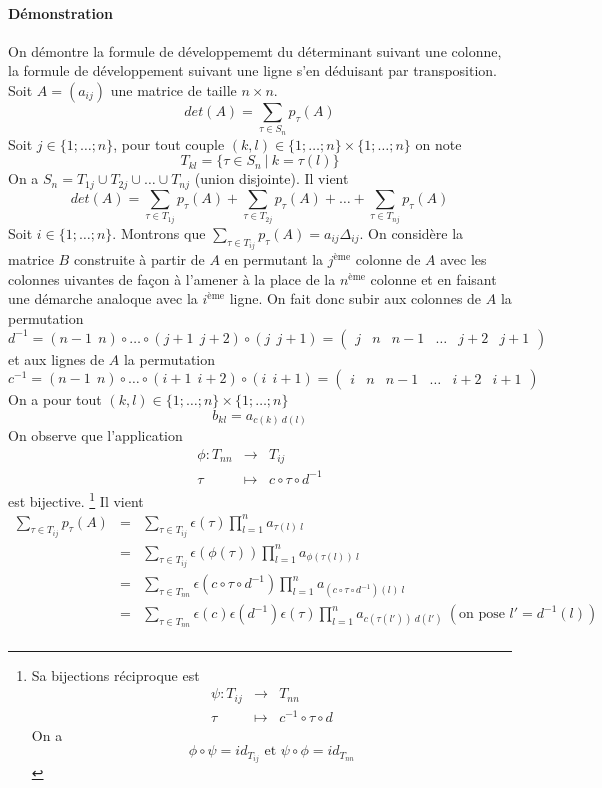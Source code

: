 \paragraph{Démonstration} On démontre la formule de développememt du déterminant suivant une colonne, la formule de développement suivant une ligne s'en déduisant par transposition. \\
Soit $A = (a_{ij})$ une matrice de taille $n \times n$.
$$det(A) = \sum_{\tau \in S_n} p_{\tau}(A)$$
Soit $j \in \{1; \ldots; n \}$, pour tout couple $(k, l) \in  \{1; \ldots; n \}\times\{1; \ldots; n \}$ on note
$$T_{kl} = \{\tau \in S_n ~ \vert ~ k = \tau(l) \}$$
On a $S_n = T_{1j} \cup T_{2j} \cup \ldots \cup T_{nj}$ (union disjointe). Il vient
$$det(A) = \sum_{\tau \in T_{1j}} p_{\tau}(A) + \sum_{\tau \in T_{2j}} p_{\tau}(A) + \ldots + \sum_{\tau \in T_{nj}} p_{\tau}(A)$$
Soit $i \in \{1; \ldots; n\}$. Montrons que $\sum_{\tau \in T_{ij}} p_{\tau}(A) = a_{ij} \Delta_{ij}$. On considère la matrice $B$ construite à partir de $A$ en permutant la $j^{\text{ème}}$ colonne de $A$ avec les colonnes uivantes de façon à l'amener à la place de la $n^{\text{ème}}$ colonne et en faisant une démarche analoque avec la $i^{\text{ème}}$ ligne. On fait donc subir aux colonnes de $A$ la permutation
$$d^{-1} = (n-1 ~~ n) \circ \ldots \circ (j+ 1 ~~ j + 2) \circ (j ~~ j+1) = \begin{pmatrix}j & n & n-1 & \ldots & j + 2 & j + 1\end{pmatrix}$$
et aux lignes de $A$ la permutation
$$c^{-1} = (n-1 ~~ n) \circ \ldots \circ (i+ 1 ~~ i + 2) \circ (i ~~ i+1) = \begin{pmatrix}i & n & n-1 & \ldots & i + 2 & i + 1\end{pmatrix}$$
On a pour tout $(k, l) \in \{1; \ldots; n \}\times\{1; \ldots; n \}$
$$b_{kl} = a_{c(k) ~ d(l)}$$
On observe que l'application
\begin{eqnarray*}
  \phi: T_{n n} &\rightarrow& T_{ij} \\
  \tau &\mapsto& c \circ \tau \circ d^{-1}
\end{eqnarray*}
est bijective. \footnote{Sa bijections réciproque est
\begin{eqnarray*}
  \psi: T_{ij} &\rightarrow& T_{n n} \\
  \tau &\mapsto& c^{-1} \circ \tau \circ d
\end{eqnarray*}
On a
$$\phi \circ \psi = id_{T_{ij}} \text{ et } \psi \circ \phi = id_{T_{n n}}$$} Il vient
\begin{eqnarray*}
  \sum_{\tau \in T_{ij}} p_{\tau}(A) &=& \sum_{\tau \in T_{ij}} \epsilon(\tau) \prod_{l=1}^{n} a_{\tau(l) ~ l} \\
    &=& \sum_{\tau \in T_{ij}} \epsilon(\phi(\tau)) \prod_{l=1}^{n} a_{\phi(\tau(l)) ~ l} \\
    &=& \sum_{\tau \in T_{n n}} \epsilon(c \circ \tau \circ d^{-1}) \prod_{l=1}^{n} a_{(c \circ \tau \circ d^{-1})(l) ~ l} \\
    &=& \sum_{\tau \in T_{n n}} \epsilon(c) \epsilon(d^{-1}) \epsilon(\tau) \prod_{l=1}^{n} a_{c(\tau(l')) ~ d(l')} ~ (\text{on pose } l' = d^{-1}(l))\\
\end{eqnarray*}
